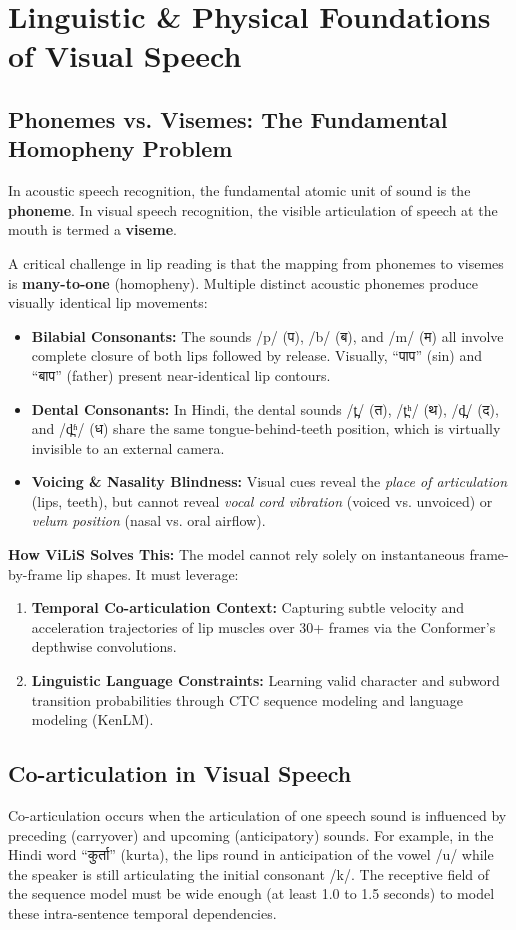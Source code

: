\documentclass[11pt,a4paper]{article}
\begin{document}
\section{Linguistic \& Physical Foundations of Visual Speech}
\subsection{Phonemes vs. Visemes: The Fundamental Homopheny Problem}
In acoustic speech recognition, the fundamental atomic unit of sound is the \textbf{phoneme}. In visual speech recognition, the visible articulation of speech at the mouth is termed a \textbf{viseme}.

A critical challenge in lip reading is that the mapping from phonemes to visemes is \textbf{many-to-one} (homopheny). Multiple distinct acoustic phonemes produce visually identical lip movements:
\begin{itemize}
    \item \textbf{Bilabial Consonants:} The sounds /p/ (प), /b/ (ब), and /m/ (म) all involve complete closure of both lips followed by release. Visually, ``पाप'' (sin) and ``बाप'' (father) present near-identical lip contours.
    \item \textbf{Dental Consonants:} In Hindi, the dental sounds /t̪/ (त), /t̪ʰ/ (थ), /d̪/ (द), and /d̪ʱ/ (ध) share the same tongue-behind-teeth position, which is virtually invisible to an external camera.
    \item \textbf{Voicing \& Nasality Blindness:} Visual cues reveal the \textit{place of articulation} (lips, teeth), but cannot reveal \textit{vocal cord vibration} (voiced vs. unvoiced) or \textit{velum position} (nasal vs. oral airflow).
\end{itemize}
\textbf{How ViLiS Solves This:} The model cannot rely solely on instantaneous frame-by-frame lip shapes. It must leverage:
\begin{enumerate}
    \item \textbf{Temporal Co-articulation Context:} Capturing subtle velocity and acceleration trajectories of lip muscles over 30+ frames via the Conformer's depthwise convolutions.
    \item \textbf{Linguistic Language Constraints:} Learning valid character and subword transition probabilities through CTC sequence modeling and language modeling (KenLM).
\end{enumerate}

\subsection{Co-articulation in Visual Speech}
Co-articulation occurs when the articulation of one speech sound is influenced by preceding (carryover) and upcoming (anticipatory) sounds. For example, in the Hindi word ``कुर्ता'' (kurta), the lips round in anticipation of the vowel /u/ while the speaker is still articulating the initial consonant /k/. The receptive field of the sequence model must be wide enough (at least 1.0 to 1.5 seconds) to model these intra-sentence temporal dependencies.
\end{document}
